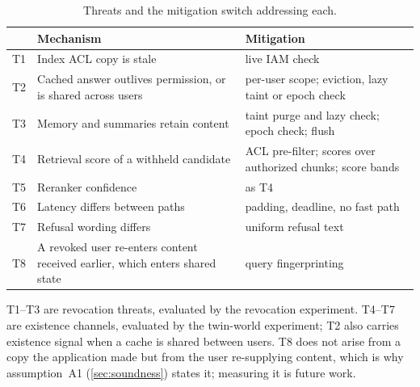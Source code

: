 \begin{table}[t]
\centering
\caption{Threats and the mitigation switch addressing each.}
\label{tab:threats}
\footnotesize
\begin{tabular}{@{}p{0.5cm}p{3.6cm}p{3.6cm}@{}}
\toprule
 & Mechanism & Mitigation \\
\midrule
T1 & Index ACL copy is stale & live IAM check \\
T2 & Cached answer outlives permission, or is shared across users & per-user scope; eviction, lazy taint or epoch check \\
T3 & Memory and summaries retain content & taint purge and lazy check; epoch check; flush \\
T4 & Retrieval score of a withheld candidate & ACL pre-filter; scores over authorized chunks; score bands \\
T5 & Reranker confidence & as T4 \\
T6 & Latency differs between paths & padding, deadline, no fast path \\
T7 & Refusal wording differs & uniform refusal text \\
T8 & A revoked user re-enters content received earlier, which enters shared state & query fingerprinting \\
\bottomrule
\end{tabular}
\end{table}

T1--T3 are revocation threats, evaluated by the revocation experiment. T4--T7 are existence channels,
evaluated by the twin-world experiment; T2 also carries existence signal when a cache is shared
between users. T8 does not arise from a copy the application made but from the user re-supplying
content, which is why assumption~A1 (\cref{sec:soundness}) states it; measuring it is future
work.
